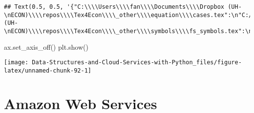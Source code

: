 \documentclass[
]{book}
\newenvironment{Shaded}{\begin{snugshade}}{\end{snugshade}}
\newcommand{\NormalTok}[1]{#1}
\begin{document}
\begin{verbatim}
## Text(0.5, 0.5, '{"C:\\\\Users\\\\fan\\\\Documents\\\\Dropbox (UH-\nECON)\\\\repos\\\\Tex4Econ\\\\_other\\\\equation\\\\cases.tex":\n"C:/Users/fan/Documents/cases.pdf",\n"C:\\\\Users\\\\fan\\\\Documents\\\\Dropbox (UH-\nECON)\\\\repos\\\\Tex4Econ\\\\_other\\\\symbols\\\\fs_symbols.tex":\n"C:/Users/fan/Documents/fs_symbols.pdf"}')
\end{verbatim}

\begin{Shaded}
\begin{Highlighting}[]
\NormalTok{ax.set\_axis\_off()}
\NormalTok{plt.show()}
\end{Highlighting}
\end{Shaded}

\begin{center}\texttt{[image: Data-Structures-and-Cloud-Services-with-Python\_files/figure-latex/unnamed-chunk-92-1]} \end{center}

\hypertarget{amazon-web-services}{%
\chapter{Amazon Web Services}\label{amazon-web-services}}
\end{document}
